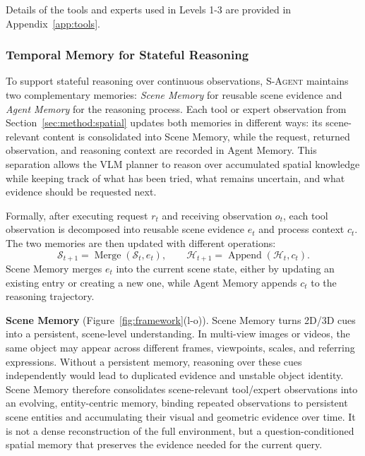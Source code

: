 \documentclass{llmxive}
\begin{document}
Details of the tools and experts used in Levels 1-3 are provided in Appendix~\ref{app:tools}.


\subsubsection{Temporal Memory for Stateful Reasoning}
\label{sec:method:memory}
To support stateful reasoning over continuous observations, \textsc{S-Agent} maintains two complementary memories: \textit{Scene Memory} for reusable scene evidence and \textit{Agent Memory} for the reasoning process. 
Each tool or expert observation from Section~\ref{sec:method:spatial} updates both memories in different ways: its scene-relevant content is consolidated into Scene Memory, while the request, returned observation, and reasoning context are recorded in Agent Memory. 
This separation allows the VLM planner to reason over accumulated spatial knowledge while keeping track of what has been tried, what remains uncertain, and what evidence should be requested next.

Formally, after executing request $r_t$ and receiving observation $o_t$, each tool observation is decomposed into reusable scene evidence $e_t$ and process context $c_t$. 
The two memories are then updated with different operations:
\vspace{-2mm}
\[
    \mathcal{S}_{t+1} = \operatorname{Merge}(\mathcal{S}_t, e_t),
    \qquad
    \mathcal{H}_{t+1} = \operatorname{Append}(\mathcal{H}_t, c_t).
\]
Scene Memory merges $e_t$ into the current scene state, either by updating an existing entry or creating a new one, while Agent Memory appends $c_t$ to the reasoning trajectory.



\textbf{Scene Memory} (Figure~\ref{fig:framework}(l-o)).
Scene Memory turns 2D/3D cues into a persistent, scene-level understanding. 
In multi-view images or videos, the same object may appear across different frames, viewpoints, scales, and referring expressions. Without a persistent memory, reasoning over these cues independently would lead to duplicated evidence and unstable object identity.
% 
Scene Memory therefore consolidates scene-relevant tool/expert observations into an evolving, entity-centric memory, binding repeated observations to persistent scene entities and accumulating their visual and geometric evidence over time. 
It is not a dense reconstruction of the full environment, but a question-conditioned spatial memory that preserves the evidence needed for the current query.
\end{document}

